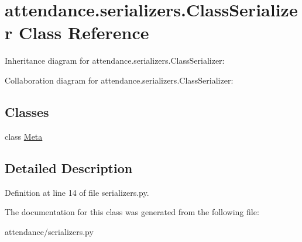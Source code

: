\hypertarget{classattendance_1_1serializers_1_1_class_serializer}{}\section{attendance.\+serializers.\+Class\+Serializer Class Reference}
\label{classattendance_1_1serializers_1_1_class_serializer}


Inheritance diagram for attendance.\+serializers.\+Class\+Serializer\+:


Collaboration diagram for attendance.\+serializers.\+Class\+Serializer\+:
\subsection*{Classes}
\begin{DoxyCompactItemize}
\item 
class \hyperlink{classattendance_1_1serializers_1_1_class_serializer_1_1_meta}{Meta}
\end{DoxyCompactItemize}


\subsection{Detailed Description}


Definition at line 14 of file serializers.\+py.



The documentation for this class was generated from the following file\+:\begin{DoxyCompactItemize}
\item 
attendance/serializers.\+py\end{DoxyCompactItemize}
